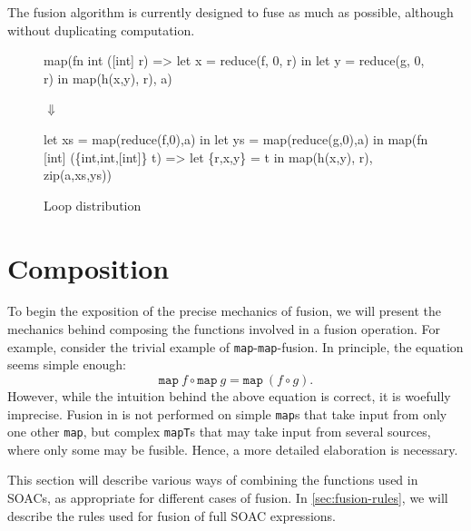 The fusion algorithm is currently designed to fuse as much as
possible, although without duplicating computation.

\begin{figure}
\begin{center}
\begin{bcolorcode}
map(fn int ([int] r) =>
      let x = reduce(f, 0, r) in
      let y = reduce(g, 0, r) in
      map(h(x,y), r),
    a)
\end{bcolorcode}

$\Downarrow$

\begin{bcolorcode}
let xs = map(reduce(f,0),a) in
let ys = map(reduce(g,0),a) in
map(fn [int] (\{int,int,[int]\} t) =>
      let \{r,x,y\} = t in
      map(h(x,y), r),
    zip(a,xs,ys))
\end{bcolorcode}
\end{center}
\caption{Loop distribution}
\label{fig:loop-distribution}
\end{figure}

\section{Composition}

\newcommand\mapcompose[7]{ (#1,#2) \underset{\texttt{map}}{\overset{#3}\circ}(#4,#5) \Rightarrow (#6,#7) }
\newcommand\filtercompose[7]{ (#1,#2) \underset{\texttt{filter}}{\overset{#3}\circ}(#4,#5) \Rightarrow (#6,#7) }
\newcommand\foldcompose[7]{ (#1,#2) \underset{\texttt{fold}}{\overset{#3}\circ}(#4,#5) \Rightarrow (#6,#7) }
\newcommand\inputmapping[0]{\mathcal{I}}
\newcommand\arrparams[1]{\textrm{params}(#1)}

To begin the exposition of the precise mechanics of fusion, we will
present the mechanics behind composing the functions involved in a
fusion operation.  For example, consider the trivial example of
\texttt{map}-\texttt{map}-fusion.  In principle, the equation seems
simple enough:
\[
\texttt{map}\ f \circ \texttt{map}\ g = \texttt{map}\ (f \circ g).
\]
However, while the intuition behind the above equation is correct, it
is woefully imprecise.  Fusion in \LO{} is not performed on simple
\texttt{map}s that take input from only one other \texttt{map}, but
complex \texttt{mapT}s that may take input from several sources, where
only some may be fusible.  Hence, a more detailed elaboration is
necessary.

This section will describe various ways of combining the functions
used in SOACs, as appropriate for different cases of fusion.  In
\cref{sec:fusion-rules}, we will describe the rules used for fusion of
full SOAC expressions.

